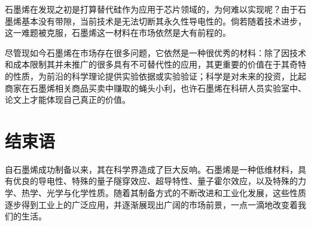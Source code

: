石墨烯在发现之初是打算替代硅作为应用于芯片领域的，为何难以实现呢？由于石墨烯基本没有带隙，当前技术是无法切断其永久性导电性的。倘若随着技术进步，这一难题被克服，石墨烯这一材料在市场依然是大有前程的。

尽管现如今石墨烯在市场存在很多问题，它依然是一种很优秀的材料：除了因技术和成本限制其并未推广的很多具有不可替代性的应用，其更重要的价值在于其奇特的性质，为前沿的科学理论提供实验依据或实验验证；科学是对未来的投资，比起商家在石墨烯相关商品买卖中赚取的蝇头小利，也许石墨烯在科研人员实验室中、论文上才能体现自己真正的价值。

\chapter{结束语}
自石墨烯成功制备以来，其在科学界造成了巨大反响。石墨烯是一种低维材料，具有优良的导电性、特殊的量子隧穿效应、超导特性、量子霍尔效应，以及特殊的力学、热学、光学与化学性质。随着其制备方式的不断改进和工业化发展，这些性质逐步得到工业上的广泛应用，并逐渐展现出广阔的市场前景，一点一滴地改变着我们的生活。
